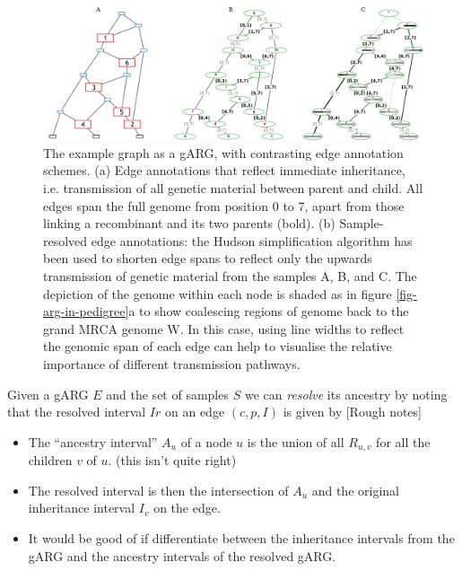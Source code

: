 \documentclass{article}
\begin{document}
\begin{figure}
\centering
\includegraphics[width=\textwidth]{illustrations/ancestry-resolution}
\caption{\label{fig-ancestry-resolution}
The \citet[][fig. 1]{wiuf1999recombination} example graph as a gARG, with contrasting
edge annotation schemes.
(a) Edge annotations that reflect immediate inheritance, i.e. transmission of all
genetic material between parent and child. All edges span the full genome from position 0 to 7,
apart from those linking a recombinant and its two parents (bold).
(b) Sample-resolved edge annotations: the Hudson simplification algorithm has been used to
shorten edge spans to reflect only the upwards transmission of genetic
material from the samples \textsf{A}, \textsf{B}, and \textsf{C}. The depiction of the genome within
each node is shaded as in figure \ref{fig-arg-in-pedigree}a to show
coalescing regions of genome back to the grand MRCA genome \textsf{W}.
In this case, using line widths to reflect the genomic span of each edge can
help to visualise the relative importance of different transmission pathways.
}
\end{figure}


Given a gARG $E$ and the set of samples $S$ we can \emph{resolve} its
ancestry by noting that the resolved interval $Ir$ on an edge $(c,p,I)$
is given by [Rough notes]

\begin{itemize}
\item The ``ancestry interval'' $A_u$ of a node $u$ is the union of
all $R_{u, v}$ for all the children $v$ of $u$. (this isn't quite right)
\item The resolved interval is then the intersection of $A_u$ and the
original inheritance interval $I_v$ on the edge.
\item It would be good of if differentiate between the inheritance intervals
 from the gARG and the ancestry intervals of the resolved gARG.
\end{itemize}
\end{document}
